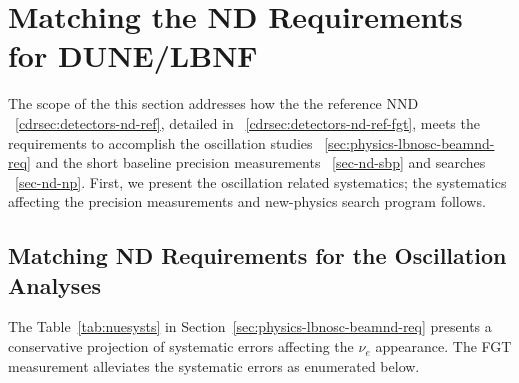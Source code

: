 
\section{Matching the ND Requirements for DUNE/LBNF} 
\label{cdrsec:detectors-nd-ref-fgt-req}

The scope of the this section addresses how the the reference NND ~\ref{cdrsec:detectors-nd-ref}, detailed 
in ~\ref{cdrsec:detectors-nd-ref-fgt}, meets the requirements  to accomplish the oscillation studies 
~\ref{sec:physics-lbnosc-beamnd-req} and the short baseline precision measurements ~\ref{sec-nd-sbp} 
and searches ~\ref{sec-nd-np}. First, we present the oscillation related systematics; 
the systematics affecting the  precision measurements and new-physics search program follows. 


\subsection{Matching ND Requirements for the Oscillation Analyses} 
\label{cdrsec:detectors-nd-ref-fgt-req-oscl}

The Table~\ref{tab:nuesysts} in Section~\ref{sec:physics-lbnosc-beamnd-req} presents a conservative 
projection of systematic errors affecting the $\nu_e$ appearance. The FGT measurement alleviates the 
systematic errors as enumerated below. 

